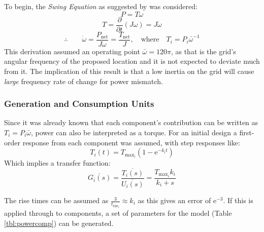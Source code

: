 To begin, the \emph{Swing Equation} as suggested by \cite{power:swing} was considered:
%
\begin{equation}
    P = T\omega
\end{equation}
%
\begin{equation}
        T = \frac{\partial}{\partial t} ( J \omega) = J \dot \omega
        \label{swing}
\end{equation}
%
\begin{equation}
        \therefore \qquad \dot \omega = \frac{P_{\text{net}}}{J \omega} = \frac{T_{\text{net}}}{J}, \quad \text{where} \quad  T_i = P_i \bar \omega^{-1}
\end{equation}
%
This derivation assumed an operating point $\bar \omega = 120\pi$, as that is the grid's angular frequency of the proposed location and it is not expected to deviate much from it.
The implication of this result is that a low inertia on the grid will cause \emph{large} frequency rate of change for power mismatch.

\subsubsection{Generation and Consumption Units}

Since it was already known that each component's contribution can be written as $T_i = P_i \bar \omega$, power can also be interpreted as a torque.
For an initial design a first-order response from each component was assumed, with step responses like:
\begin{equation}
        T_i(t) = T_{\text{max}_i}(1 - \mathrm{e}^{-k_i t})
\end{equation}
Which implies a transfer function:
\begin{equation}
        \overline{G_{i}(s)} = \frac{\overline{T_{i}(s)}}{\overline{U_{i}(s)}} = \frac{T_{\text{max}_{i}}k_i}{k_i + {s}}
\end{equation}

The rise times can be assumed as $\frac{3}{t_{\text{rise}_i}} \approx k_i$ as this gives an error of $\mathrm{e}^{-3}$. If this is applied through to components, a set of parameters for the model (Table \ref{tbl:powercomp}) can be generated.


